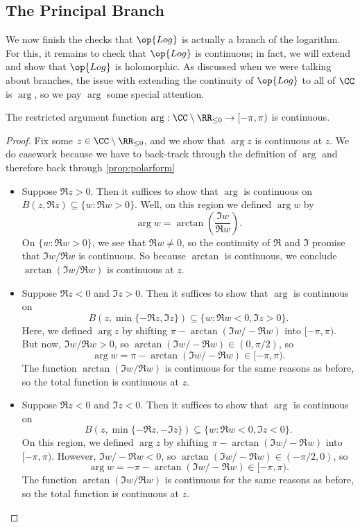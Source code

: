 \subsection{The Principal Branch}
We now finish the checks that $\op{Log}$ is actually a branch of the logarithm. For this, it remains to check that $\op{Log}$ is continuous; in fact, we will extend and show that $\op{Log}$ is holomorphic. As discussed when we were talking about branches, the issue with extending the continuity of $\op{Log}$ to all of $\CC$ is $\arg$, so we pay $\arg$ some special attention.
\begin{lemma}
	The restricted argument function $\arg:\CC\setminus\RR_{\le0}\to[-\pi,\pi)$ is continuous.
\end{lemma}
\begin{proof}
	Fix some $z\in\CC\setminus\RR_{\le0}$, and we show that $\arg z$ is continuous at $z$. We do casework because we have to back-track through the definition of $\arg$ and therefore back through \autoref{prop:polarform}
	\begin{itemize}
		\item Suppose $\Re z>0$. Then it suffices to show that $\arg$ is continuous on $B(z,\Re z)\subseteq\{w:\Re w>0\}$. Well, on this region we defined $\arg w$ by
		\[\arg w=\arctan\left(\frac{\Im w}{\Re w}\right).\]
		On $\{w:\Re w>0\}$, we see that $\Re w\ne0$, so the continuity of $\Re$ and $\Im$ promise that $\Im w/\Re w$ is continuous. So because $\arctan$ is continuous, we conclude $\arctan(\Im w/\Re w)$ is continuous at $z$.
		\item Suppose $\Re z<0$ and $\Im z>0$. Then it suffices to show that $\arg$ is continuous on
		\[B(z,\min\{-\Re z,\Im z\})\subseteq\{w:\Re w<0,\Im z>0\}.\]
		Here, we defined $\arg z$ by shifting $\pi-\arctan(\Im w/-\Re w)$ into $[-\pi,\pi)$. But now, $\Im w/\Re w>0$, so $\arctan(\Im w/-\Re w)\in(0,\pi/2)$, so
		\[\arg w=\pi-\arctan(\Im w/-\Re w)\in[-\pi,\pi).\]
		The function $\arctan(\Im w/\Re w)$ is continuous for the same reasons as before, so the total function is continuous at $z$.
		\item Suppose $\Re z<0$ and $\Im z<0$. Then it suffices to show that $\arg$ is continuous on
		\[B(z,\min\{-\Re z,-\Im z\})\subseteq\{w:\Re w<0,\Im z<0\}.\]
		On this region, we defined $\arg z$ by shifting $\pi-\arctan(\Im w/-\Re w)$ into $[-\pi,\pi)$. However, $\Im w/-\Re w<0$, so $\arctan(\Im w/-\Re w)\in(-\pi/2,0)$, so
		\[\arg w=-\pi-\arctan(\Im w/-\Re w)\in[-\pi,\pi).\]
		The function $\arctan(\Im w/\Re w)$ is continuous for the same reasons as before, so the total function is continuous at $z$.

\end{itemize}
\end{proof}
